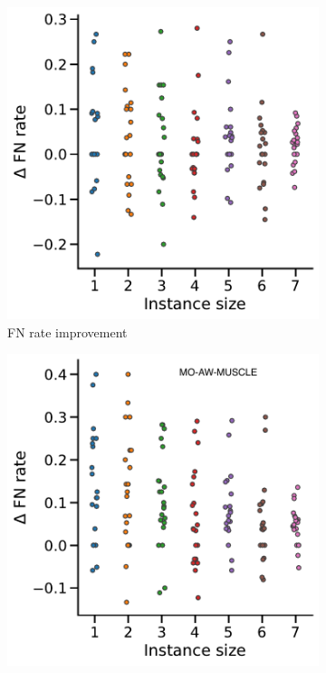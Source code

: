 \begin{figure}[!htbp]
\begin{adjustwidth}{-1.2cm}{}
\begin{subfigure}{0.40\textwidth}
		\end{subfigure}
		\begin{subfigure}{0.40\textwidth} \includegraphics[width=\textwidth]{Figure/delta3} \caption{ FN rate improvement}\label{fig:scatter}\end{subfigure}
		\begin{subfigure}{0.40\textwidth} \includegraphics[width=\textwidth]{Figure/delta4-momuscle} 
		\end{subfigure}
		

\end{adjustwidth}
\end{figure}
